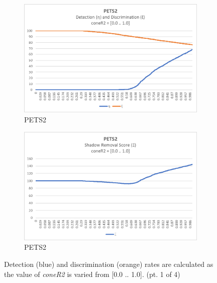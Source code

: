 \begin{appendices}
\begin{figure}
\hfill
\begin{subfigure}{.45\linewidth}
  \includegraphics[width=1\linewidth]{figures/appendix/pets2_coneR2_response.jpg}
  \caption{PETS2}
\end{subfigure}
\hfill
\begin{subfigure}{.45\linewidth}
  \includegraphics[width=1\linewidth]{figures/appendix/pets2_coneR2_score.jpg}
  \caption{PETS2}
\end{subfigure}

\caption{Detection (blue) and discrimination (orange) rates are calculated as the value of \textit{coneR2} is varied from [0.0 .. 1.0]. (pt. 1 of 4)}
\end{figure}


\end{appendices}
